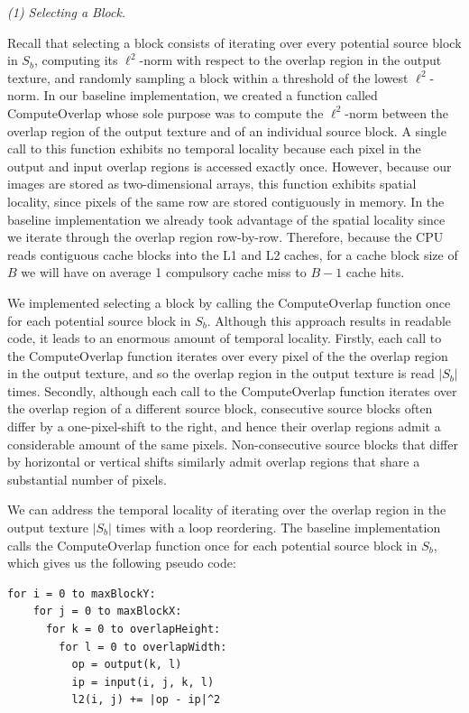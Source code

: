 \documentclass[letterpaper]{article}
\newcommand{\inline}[1]{{\ttfamily\hyphenchar\font=45 #1}}
\begin{document}
\textit{(1) Selecting a Block.}

Recall that selecting a block consists of iterating over every potential source block in $S_b$, computing its $\ell ^2$-norm with respect to the overlap region in the output texture, and randomly sampling a block within a threshold of the lowest $\ell ^2$-norm. In our baseline implementation, we created a function called \inline{ComputeOverlap} whose sole purpose was to compute the $\ell ^2$-norm between the overlap region of the output texture and of an individual source block. A single call to this function exhibits no temporal locality because each pixel in the output and input overlap regions is accessed exactly once. However, because our images are stored as two-dimensional arrays, this function exhibits spatial locality, since pixels of the same row are stored contiguously in memory. In the baseline implementation we already took advantage of the spatial locality since we iterate through the overlap region row-by-row. Therefore, because the CPU reads contiguous cache blocks into the L1 and L2 caches, for a cache block size of $B$ we will have on average 1 compulsory cache miss to $B-1$ cache hits.

We implemented selecting a block by calling the \inline{ComputeOverlap} function once for each potential source block in $S_b$. Although this approach results in readable code, it leads to an enormous amount of temporal locality. Firstly, each call to the \inline{ComputeOverlap} function iterates over every pixel of the the overlap region in the output texture, and so the overlap region in the output texture is read $|S_b|$ times. Secondly, although each call to the \inline{ComputeOverlap} function iterates over the overlap region of a different source block, consecutive source blocks often differ by a one-pixel-shift to the right, and hence their overlap regions admit a considerable amount of the same pixels. Non-consecutive source blocks that differ by horizontal or vertical shifts similarly admit overlap regions that share a substantial number of pixels.

We can address the temporal locality of iterating over the overlap region in the output texture $|S_b|$ times with a loop reordering. The baseline implementation calls the \inline{ComputeOverlap} function once for each potential source block in $S_b$, which gives us the following pseudo code:

\begin{lstlisting}[style=cppstyle]
  for i = 0 to maxBlockY:
    for j = 0 to maxBlockX:
      for k = 0 to overlapHeight:
        for l = 0 to overlapWidth:
          op = output(k, l)
          ip = input(i, j, k, l)
          l2(i, j) += |op - ip|^2
\end{lstlisting}
\end{document}
